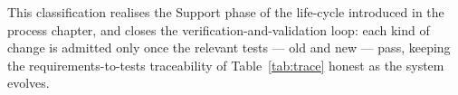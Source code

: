 This classification realises the Support phase of the life-cycle introduced in
the process chapter, and closes the verification-and-validation loop: each kind
of change is admitted only once the relevant tests --- old and new --- pass,
keeping the requirements-to-tests traceability of Table~\ref{tab:trace} honest as
the system evolves.
